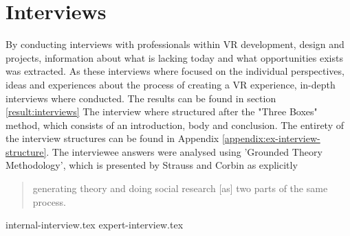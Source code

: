 \section{Interviews}
By conducting interviews with professionals within VR development, design and projects, information about what is lacking today and what opportunities exists was extracted. As these interviews where focused on the individual perspectives, ideas and experiences about the process of creating a VR experience, in-depth interviews where conducted\cite{interview:Boyce2006}. The results can be found in section \ref{result:interviews}
The interview where structured after the "Three Boxes" method, which consists of an introduction, body and conclusion\cite{interview:Hall2013}. The entirety of the interview structures can be found in Appendix \ref{appendix:ex-interview-structure}. The interviewee answers were analysed using 'Grounded Theory Methodology', which is presented by Strauss and Corbin\cite{interview:strauss1994grounded} as explicitly \begin{quote} generating theory and doing social research [as] two parts of the same process.\end{quote}
{internal-interview.tex}
{expert-interview.tex}
